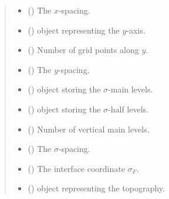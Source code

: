 \documentclass[letterpaper,10pt,english]{sphinxmanual}
\begin{document}
\begin{fulllineitems}
\begin{quote}
\begin{description}
\begin{itemize}
\item {} 
{\hyperref[\detokenize{api:grids.xyz_grid.XYZGrid.dx}]{}} () \textendash{} The \(x\)-spacing.

\item {} 
{\hyperref[\detokenize{api:grids.xyz_grid.XYZGrid.y}]{}} () \textendash{} {\hyperref[\detokenize{api:grids.axis.Axis}]{}} object representing the \(y\)-axis.

\item {} 
{\hyperref[\detokenize{api:grids.xyz_grid.XYZGrid.ny}]{}} () \textendash{} Number of grid points along \(y\).

\item {} 
{\hyperref[\detokenize{api:grids.xyz_grid.XYZGrid.dy}]{}} () \textendash{} The \(y\)-spacing.

\item {} 
 () \textendash{} {\hyperref[\detokenize{api:grids.axis.Axis}]{}} object storing the \(\sigma\)-main levels.

\item {} 
 () \textendash{} {\hyperref[\detokenize{api:grids.axis.Axis}]{}} object storing the \(\sigma\)-half levels.

\item {} 
 () \textendash{} Number of vertical main levels.

\item {} 
 () \textendash{} The \(\sigma\)-spacing.

\item {} 
 () \textendash{} The interface coordinate \(\sigma_F\).

\item {} 
{\hyperref[\detokenize{api:module-grids.topography}]{}} () \textendash{} {\hyperref[\detokenize{api:grids.topography.Topography2d}]{}} object representing
the topography.


\end{itemize}
\end{description}
\end{quote}
\end{fulllineitems}
\end{document}
